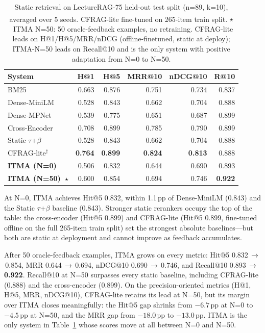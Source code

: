 \documentclass[preprint,12pt]{elsarticle}
\begin{document}
\begin{table}[t]
\centering
\small
\caption{Static retrieval on LectureRAG-75 held-out test split (n=89, k=10),
averaged over 5 seeds.
\textsuperscript{\textdagger}CFRAG-lite fine-tuned on 265-item train split.
$\star$~ITMA N=50: 50 oracle-feedback examples, no retraining.
CFRAG-lite leads on H@1/H@5/MRR/nDCG (offline-finetuned, static at deploy);
ITMA-N=50 leads on Recall@10 and is the only system with positive
adaptation from N=0 to N=50.}
\label{tab:retrieval}
\begin{tabular}{lrrrrr}
\toprule
System & H@1 & H@5 & MRR@10 & nDCG@10 & R@10 \\
\midrule
BM25 & 0.663 & 0.876 & 0.751 & 0.734 & 0.837 \\
Dense-MiniLM & 0.528 & 0.843 & 0.662 & 0.704 & 0.888 \\
Dense-MPNet & 0.539 & 0.775 & 0.651 & 0.687 & 0.899 \\
Cross-Encoder & 0.708 & 0.899 & 0.785 & 0.790 & 0.899 \\
Static $\tau$+$\beta$ & 0.528 & 0.843 & 0.662 & 0.704 & 0.888 \\
CFRAG-lite$^\dagger$ & \textbf{0.764} & \textbf{0.899} & \textbf{0.824} & \textbf{0.813} & 0.888 \\
\midrule
\textbf{ITMA (N=0)} & 0.506 & 0.832 & 0.644 & 0.690 & 0.893 \\
\textbf{ITMA (N=50)~$\star$} & 0.600 & 0.854 & 0.694 & 0.746 & \textbf{0.922} \\
\bottomrule
\end{tabular}
\end{table}

At N=0, ITMA achieves Hit@5 0.832, within 1.1\,pp of Dense-MiniLM (0.843) and
the Static $\tau$+$\beta$ baseline (0.843).  Stronger static rerankers occupy
the top of the table: the cross-encoder (Hit@5 0.899) and CFRAG-lite
(Hit@5 0.899, fine-tuned offline on the full 265-item train split)
set the strongest absolute baselines---but both are static at deployment and
cannot improve as feedback accumulates.

After 50 oracle-feedback examples, ITMA grows on every metric: Hit@5
0.832\,$\rightarrow$\,0.854, MRR 0.644\,$\rightarrow$\,0.694, nDCG@10
0.690\,$\rightarrow$\,0.746, and Recall@10 0.893\,$\rightarrow$\,\textbf{0.922}.
Recall@10 at N=50 surpasses every static baseline, including CFRAG-lite
(0.888) and the cross-encoder (0.899).  On the precision-oriented metrics
(H@1, H@5, MRR, nDCG@10), CFRAG-lite retains its lead at N=50, but its
margin over ITMA closes meaningfully: the Hit@5 gap shrinks from $-6.7$\,pp
at N=0 to $-4.5$\,pp at N=50, and the MRR gap from $-18.0$\,pp to $-13.0$\,pp.
ITMA is the only system in Table~\ref{tab:retrieval} whose scores move at all
between N=0 and N=50.
\end{document}
